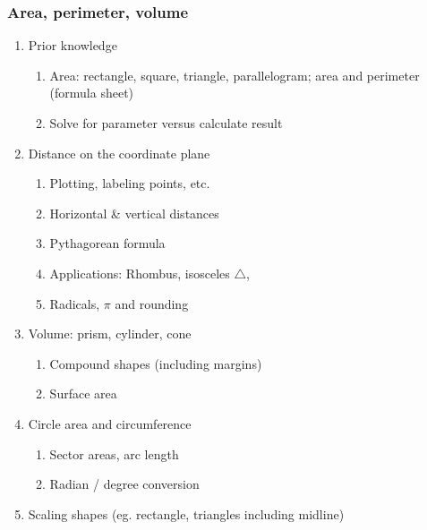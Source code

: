 \documentclass[12pt, twoside]{article}
\begin{document}
\subsubsection*{Area, perimeter, volume}
  \begin{enumerate}
    \item Prior knowledge
      \begin{enumerate}
        \item Area: rectangle, square, triangle, parallelogram; area and perimeter (formula sheet)
        \item Solve for parameter versus calculate result
      \end{enumerate}

    \item Distance on the coordinate plane
      \begin{enumerate}
        \item Plotting, labeling points, etc.
        \item Horizontal \& vertical distances
        \item Pythagorean formula
        \item Applications: Rhombus, isosceles $\triangle$,
        \item Radicals, $\pi$ and rounding
      \end{enumerate}

    \item Volume: prism, cylinder, cone
      \begin{enumerate}
        \item Compound shapes (including margins)
        \item Surface area
      \end{enumerate}

    \item Circle area and circumference
      \begin{enumerate}
        \item Sector areas, arc length
        \item Radian / degree conversion
      \end{enumerate}

    \item Scaling shapes (eg. rectangle, triangles including midline)
  \end{enumerate}
\end{document}
